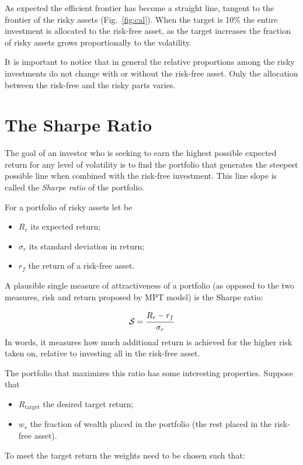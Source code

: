 As expected the efficient frontier has become a straight line, tangent to the frontier of the risky assets (Fig.~\ref{fig:cal}). When the target is 10\% the entire investment is allocated to the risk-free asset, as the target increases the fraction of risky assets grows proportionally to the volatility. 

It is important to notice that in general the relative proportions among the risky investments do not change with or without the risk-free asset. Only the allocation between the risk-free and the risky parts varies.

\section{The Sharpe Ratio}
\label{the-sharpe-ratio}
The goal of an investor who is seeking to earn the highest possible expected return for any level of volatility is to find the portfolio that generates the steepest possible line when combined with the risk-free investment. This line slope is called the \emph{Sharpe ratio} of the portfolio.

For a portfolio of risky assets let be

\begin{itemize}
\tightlist
\item \(R_r\) its expected return;
\item \(\sigma_r\) its standard deviation in return;
\item \(r_f\) the return of a risk-free asset.
\end{itemize}

A plausible single measure of attractiveness of a portfolio (as opposed to the two measures, risk and return proposed by MPT model) is the Sharpe ratio:

\begin{equation} 
\mathcal{S} = \cfrac{R_r - r_f}{\sigma_r} 
\end{equation}
\noindent
In words, it measures how much additional return is achieved for the higher risk taken on, relative to investing all in the risk-free asset. 

The portfolio that maximizes this ratio has some interesting properties. Suppose that

\begin{itemize}
\tightlist
\item
  \(R_\textrm{target}\) the desired target return;
\item
  \(w_r\) the fraction of wealth placed in the portfolio (the rest placed in the risk-free asset).
\end{itemize}
\noindent
To meet the target return the weights need to be chosen such that:

